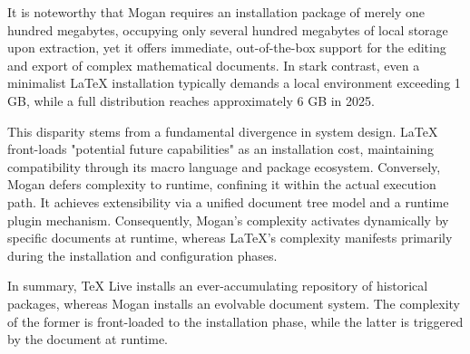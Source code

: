 It is noteworthy that Mogan requires an installation package of merely one hundred megabytes, occupying only several hundred megabytes of local storage upon extraction, yet it offers immediate, out-of-the-box support for the editing and export of complex mathematical documents. In stark contrast, even a minimalist \LaTeX{} installation typically demands a local environment exceeding 1 GB, while a full distribution reaches approximately 6 GB in 2025.

This disparity stems from a fundamental divergence in system design. \LaTeX{} front-loads "potential future capabilities" as an installation cost, maintaining compatibility through its macro language and package ecosystem. Conversely, Mogan defers complexity to runtime, confining it within the actual execution path. It achieves extensibility via a unified document tree model and a runtime plugin mechanism. Consequently, Mogan's complexity activates dynamically by specific documents at runtime, whereas \LaTeX{}'s complexity manifests primarily during the installation and configuration phases.

In summary, TeX Live installs an ever-accumulating repository of historical packages, whereas Mogan installs an evolvable document system. The complexity of the former is front-loaded to the installation phase, while the latter is triggered by the document at runtime.
